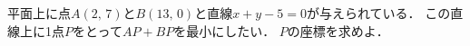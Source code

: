 \documentclass[../../main.tex]{subfiles}
\begin{document}
平面上に点$A(2, \, 7)$と$B(13, \, 0)$と直線$x+y-5=0$が与えられている．
この直線上に1点$P$をとって$AP+BP$を最小にしたい．
$P$の座標を求めよ．
\end{document}
